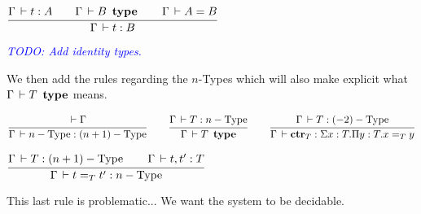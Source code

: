 \documentclass[a4paper,english]{lipics-utf8x}
\newcommand\meta[1]{\noindent\textcolor{blue}{\emph{#1}}}
\begin{document}
  \begin{center}
  \(
    \ru{\Gamma \der t : A \qquad
        \Gamma \der B \type \qquad
        \Gamma \der A = B
      }{\Gamma \der t : B}
  \)
  \end{center}

  \meta{TODO: Add identity types.}

  \noindent %
  We then add the rules regarding the $n$-Types which will also make explicit
  what $\Gamma \,\vdash T \operatorname{\ \mathbf{type}}$ means.

  \begin{center}
  \(
    \ru{\der \Gamma
      }{\Gamma \der n-\Type : (n+1)-\Type}
    \qquad
    \ru{\Gamma \der T : n-\Type
      }{\Gamma \der T \type}
    \qquad
    \ru{\Gamma \der T : (-2)-\Type
      }{\Gamma \der \ctr_T : \Sigma x:T. \Pi y:T. x =_T y}
  \)
  \end{center}

  \begin{center}
  \(
    \ru{\Gamma \der T : (n+1)-\Type \qquad
        \Gamma \der t,t' : T
      }{\Gamma \der t =_T t' : n-\Type}
  \)
  \end{center}

  This last rule is problematic...
  We want the system to be decidable.


%
%
\end{document}
